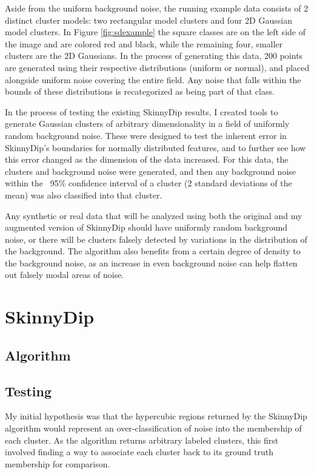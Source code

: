\documentclass{sig-alternate-05-2015}
\begin{document}
Aside from the uniform background noise, the running example data consists of 2 distinct cluster models: two rectangular model clusters and four 2D Gaussian model clusters. In Figure \ref{fig:sdexample} the square classes are on the left side of the image and are colored red and black, while the remaining four, smaller clusters are the 2D Gaussians. In the process of generating this data, 200 points are generated using their respective distributions (uniform or normal), and placed alongside uniform noise covering the entire field. Any noise that falls within the bounds of these distributions is recategorized as being part of that class.

In the process of testing the existing SkinnyDip results, I created tools to generate Gaussian clusters of arbitrary dimensionality in a field of uniformly random background noise. These were designed to test the inherent error in SkinnyDip's boundaries for normally distributed features, and to further see how this error changed as the dimension of the data increased. For this data, the clusters and background noise were generated, and then any background noise within the ~95\% confidence interval of a cluster (2 standard deviations of the mean) was also classified into that cluster.

Any synthetic or real data that will be analyzed using both the original and my augmented version of SkinnyDip should have uniformly random background noise, or there will be clusters falsely detected by variations in the distribution of the background. The algorithm also benefits from a certain degree of density to the background noise, as an increase in even background noise can help flatten out falsely modal areas of noise.

\section{SkinnyDip}
\subsection{Algorithm}

\subsection{Testing}
My initial hypothesis was that the hypercubic regions returned by the SkinnyDip algorithm would represent an over-classification of noise into the membership of each cluster. As the algorithm returns arbitrary labeled clusters, this first involved finding a way to associate each cluster back to its ground truth membership for comparison. \\
\end{document}
